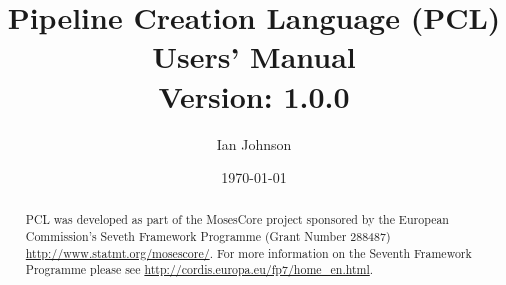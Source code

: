 \documentclass[11pt,a4paper,openright]{report}
\newcommand{\ReleaseVersion}{1.0.0}
\begin{document}
\title{\huge{Pipeline Creation Language (PCL)}\\
\LARGE{Users' Manual}\\
\normalsize{Version: \ReleaseVersion}}
\author{Ian Johnson}
\date{\today}

\maketitle

\onehalfspacing

\begin{abstract}
PCL was developed as part of the MosesCore project sponsored by the European Commission's Seveth Framework Programme (Grant Number 288487) \url{http://www.statmt.org/mosescore/}. For more information on the Seventh Framework Programme please see \url{http://cordis.europa.eu/fp7/home_en.html}.
\end{abstract}


\tableofcontents
\listoffigures
\listoftables

\cleardoublepage
\setcounter{page}{1}





{}

\end{document}
